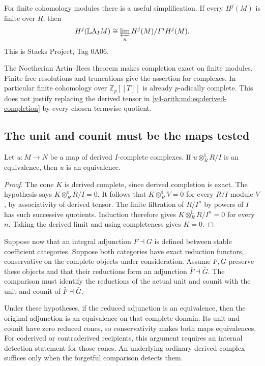 For finite cohomology modules there is a useful simplification.
If every $H^j(M)$ is finite over $R$, then
\[
 H^j(\mathbb L\Lambda_I M)
 \cong\varprojlim_nH^j(M)/I^nH^j(M).
\]
This is Stacks Project, Tag 0A06.

The Noetherian
Artin--Rees theorem makes completion exact on finite modules.
Finite free resolutions and truncations give the assertion
for complexes. In particular finite cohomology over
$\mathbb Z_p[[T]]$ is already $p$-adically complete.
This does not justify replacing the derived tensor in
\eqref{v4-arith:md:eq:derived-completion} by every chosen
termwise quotient.

\subsection{The unit and counit must be the maps tested}

\begin{proposition}
\label{v4-arith:md:prop:conservative}
Let $u:M\to N$ be a map of derived $I$-complete complexes.
If $u\otimes_R^{\mathbb L}R/I$ is an equivalence, then $u$
is an equivalence.
\end{proposition}

\begin{proof}
The cone $K$ is derived complete, since derived completion is
exact. The hypothesis says $K\otimes_R^{\mathbb L}R/I=0$.
It follows that $K\otimes_R^{\mathbb L}V=0$ for every
$R/I$-module $V$, by associativity of derived tensor.
The finite filtration of $R/I^n$ by powers of $I$ has such
successive quotients. Induction therefore gives
$K\otimes_R^{\mathbb L}R/I^n=0$ for every $n$.
Taking the derived limit and using completeness gives $K=0$.
\end{proof}

Suppose now that an integral adjunction $F\dashv G$ is defined
between stable coefficient categories. Suppose both categories
have exact reduction functors, conservative on the complete
objects under consideration. Assume $F,G$ preserve these
objects and that their reductions form an adjunction
$\bar F\dashv\bar G$. The comparison must identify the
reductions of the actual unit and counit with the unit and
counit of $\bar F\dashv\bar G$.

Under these hypotheses, if the reduced adjunction is an
equivalence, then the original adjunction is an equivalence
on that complete domain. Its unit and counit have zero
reduced cones, so conservativity makes both maps equivalences.
For coderived or contraderived recipients, this argument
requires an internal detection statement for those cones.
An underlying ordinary derived complex suffices only when the
forgetful comparison detects them.

